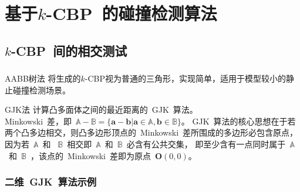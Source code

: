   \section{基于$k$-CBP~的碰撞检测算法}
    
      \subsection{$k$-CBP~间的相交测试}
      \begin{frame}
        \frametitle{}
        \begin{block}{AABB树法}
          将生成的$k$-CBP视为普通的三角形，实现简单，适用于模型较小的静止碰撞检测场景。
        \end{block}
        \begin{block}{GJK法}
          计算凸多面体之间的最近距离的~GJK~算法。\\
          Minkowski~差，即~$\mathbb{A} - \mathbb{B} = \{ \bm{a} - \bm{b} | \bm{a} \in \mathbb{A}, \bm{b} \in \mathbb{B}\} $。
GJK~算法的核心思想在于若两个凸多边相交，则凸多边形顶点的~Minkowski~差所围成的多边形必包含原点，因为若~$\mathbb{A}$~和
~$\mathbb{B}$~相交即~$\mathbb{A}$~和~$\mathbb{B}$~必含有公共交集，
即至少含有一点同时属于~$\mathbb{A}$~和~$\mathbb{B}$~，该点的~Minkowski~差即为原点~$\bm{O}(0, 0)$。
        \end{block}

      \end{frame}

      \begin{frame}
        \frametitle{二维~GJK~算法示例}
        \begin{figure}[htbp]
        \end{figure}
        
      \end{frame}

